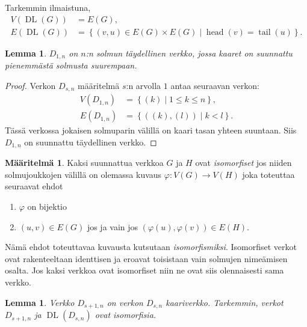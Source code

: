 \documentclass[finnish]{tktltiki2}
\newtheorem{lem}[lau]{Lemma}
\theoremstyle{definition}
\newtheorem{maar}[lau]{Määritelmä}
\theoremstyle{remark}
\newcommand{\set}[1]{\left\{ #1 \right\}}
\newcommand{\from}{\colon}
\DeclareMathOperator{\head}{head}
\DeclareMathOperator{\tail}{tail}
\DeclareMathOperator{\DL}{DL}
\newcommand{\Dsn}{D_{s,n}}
\newcommand{\Dssn}{D_{s+1,n}}
\begin{document}

Tarkemmin ilmaistuna,
%
\begin{align*}
    V(\DL(G)) &= E(G), \\
    E(\DL(G)) &= \set{(v,u) \in E(G) \times E(G) \mid \head(v) = \tail(u)}.
\end{align*}


\begin{lem}
    $D_{1,n}$ on $n$:n solmun täydellinen verkko, jossa kaaret on suunnattu
    pienemmästä solmusta suurempaan.
\end{lem}

\begin{proof}
    Verkon $\Dsn$ määritelmä $s$:n arvolla $1$ antaa seuraavan verkon:
    \begin{align*}
        V(D_{1,n}) &= \set{(k) \mid 1 \leq k \leq n}, \\
        E(D_{1,n}) &= \set{((k), (l)) \mid k < l}.
    \end{align*}
    Tässä verkossa jokaisen solmuparin välillä on kaari tasan yhteen
    suuntaan. Siis $D_{1,n}$ on suunnattu täydellinen verkko.
\end{proof}

\begin{maar}
    Kaksi suunnattua verkkoa $G$ ja $H$ ovat \emph{isomorfiset} jos niiden
    solmujoukkojen välillä on olemassa kuvaus $\varphi \from V(G) \to V(H)$
    joka toteuttaa seuraavat ehdot
    \begin{enumerate}
        \item $\varphi$ on bijektio
        \item $(u,v) \in E(G)$ jos ja vain jos $(\varphi(u), \varphi(v)) \in
            E(H)$.
    \end{enumerate}
\end{maar}

Nämä ehdot toteuttavaa kuvausta kutsutaan \emph{isomorfismiksi}. Isomorfiset
verkot ovat rakenteeltaan identtisen ja eroavat toisistaan vain solmujen
nimeämisen osalta. Jos kaksi verkkoa ovat isomorfiset niin ne ovat siis
olennaisesti sama verkko.

\begin{lem}
    Verkko $\Dssn$ on verkon $\Dsn$ kaariverkko. Tarkemmin, verkot $\Dssn$ ja
    $\DL(\Dsn)$ ovat isomorfisia.
\end{lem}
\end{document}
